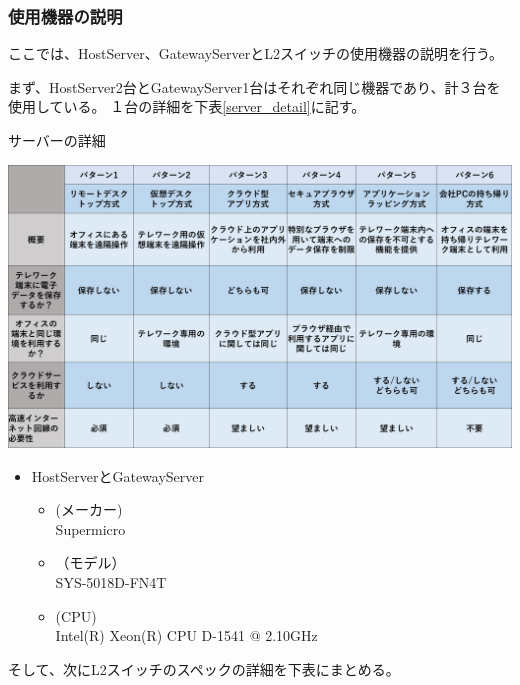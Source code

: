 \documentclass[11pt,a4j,titlepage]{jreport}
\begin{document}
\subsubsection{使用機器の説明}
ここでは、HostServer、GatewayServerとL2スイッチの使用機器の説明を行う。\par
まず、HostServer2台とGatewayServer1台はそれぞれ同じ機器であり、計３台を使用している。
１台の詳細を下表\ref{server_detail}に記す。

\begin{table}[H]
    \centering
    \caption{サーバーの詳細}
    \includegraphics*[width=1.0\textwidth,page=6]{graphs/telework_list.pdf}
    \label{server_detail}
\end{table}


\begin{itemize}
    \setlength{\parskip}{0.05cm} %
    \setlength{\itemsep}{0.05cm}
    \item HostServerとGatewayServer\mbox{}
    \begin{itemize}
        \item (メーカー)\mbox{}\\Supermicro
        \item （モデル）\mbox{}\\SYS-5018D-FN4T
        \item (CPU)\mbox{} \\
            Intel(R) Xeon(R) CPU D-1541 @ 2.10GHz
    \end{itemize}
    
\end{itemize}
\fi
そして、次にL2スイッチのスペックの詳細を下表にまとめる。
\end{document}
